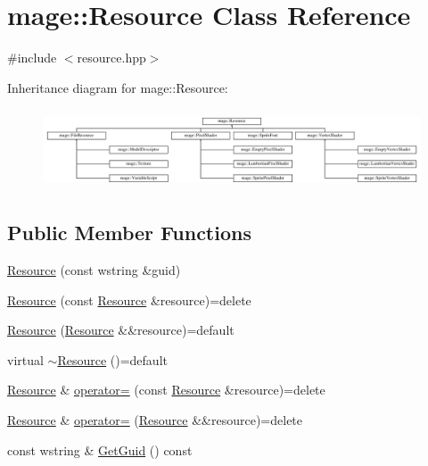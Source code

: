 \hypertarget{classmage_1_1_resource}{}\section{mage\+:\+:Resource Class Reference}
\label{classmage_1_1_resource}


{\ttfamily \#include $<$resource.\+hpp$>$}

Inheritance diagram for mage\+:\+:Resource\+:\begin{figure}[H]
\begin{center}
\leavevmode
\includegraphics[height=2.380952cm]{classmage_1_1_resource}
\end{center}
\end{figure}
\subsection*{Public Member Functions}
\begin{DoxyCompactItemize}
\item 
\hyperlink{classmage_1_1_resource_a3e2540455d88e1825a680fb4e7fe25c4}{Resource} (const wstring \&guid)
\item 
\hyperlink{classmage_1_1_resource_a4ee2dba2675546b603e03a69a2f2db52}{Resource} (const \hyperlink{classmage_1_1_resource}{Resource} \&resource)=delete
\item 
\hyperlink{classmage_1_1_resource_a48b6219dc7c2366d097dd462fb5448b4}{Resource} (\hyperlink{classmage_1_1_resource}{Resource} \&\&resource)=default
\item 
virtual \hyperlink{classmage_1_1_resource_a26cea6261aac321d95ac745703f1a3e8}{$\sim$\+Resource} ()=default
\item 
\hyperlink{classmage_1_1_resource}{Resource} \& \hyperlink{classmage_1_1_resource_ad8fa57f37eb253b90d18d33383b12875}{operator=} (const \hyperlink{classmage_1_1_resource}{Resource} \&resource)=delete
\item 
\hyperlink{classmage_1_1_resource}{Resource} \& \hyperlink{classmage_1_1_resource_a5d087980bb8fb1cd7d96c22d9e0eb519}{operator=} (\hyperlink{classmage_1_1_resource}{Resource} \&\&resource)=delete
\item 
const wstring \& \hyperlink{classmage_1_1_resource_a4e05079ab19ef95e11cefa487690fd25}{Get\+Guid} () const
\end{DoxyCompactItemize}
